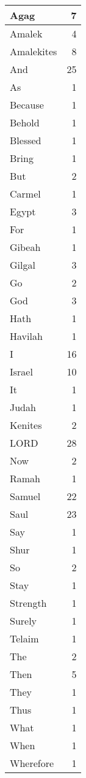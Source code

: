 \begin{center}
\begin{longtable}{l|r}
\hline \hline
\endlastfoot
Agag & 7 \\ \hline
Amalek & 4 \\ \hline
Amalekites & 8 \\ \hline
And & 25 \\ \hline
As & 1 \\ \hline
Because & 1 \\ \hline
Behold & 1 \\ \hline
Blessed & 1 \\ \hline
Bring & 1 \\ \hline
But & 2 \\ \hline
Carmel & 1 \\ \hline
Egypt & 3 \\ \hline
For & 1 \\ \hline
Gibeah & 1 \\ \hline
Gilgal & 3 \\ \hline
Go & 2 \\ \hline
God & 3 \\ \hline
Hath & 1 \\ \hline
Havilah & 1 \\ \hline
I & 16 \\ \hline
Israel & 10 \\ \hline
It & 1 \\ \hline
Judah & 1 \\ \hline
Kenites & 2 \\ \hline
LORD & 28 \\ \hline
Now & 2 \\ \hline
Ramah & 1 \\ \hline
Samuel & 22 \\ \hline
Saul & 23 \\ \hline
Say & 1 \\ \hline
Shur & 1 \\ \hline
So & 2 \\ \hline
Stay & 1 \\ \hline
Strength & 1 \\ \hline
Surely & 1 \\ \hline
Telaim & 1 \\ \hline
The & 2 \\ \hline
Then & 5 \\ \hline
They & 1 \\ \hline
Thus & 1 \\ \hline
What & 1 \\ \hline
When & 1 \\ \hline
Wherefore & 1 \\ \hline

\end{longtable}
\end{center}
